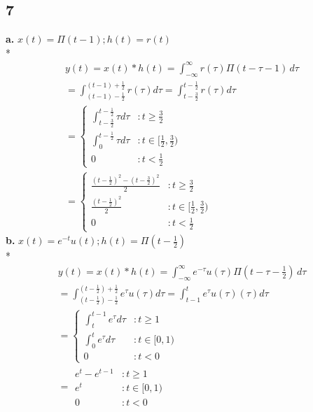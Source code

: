 \documentclass[12pt]{article}
\begin{document}
\subsection*{7}
\textbf{a.} 
$x(t) = \Pi ( t - 1); h(t) = r(t)$ \\*
\begin{align*}
	y(t) = x(t) * h(t) = \int_{-\infty}^{\infty} r(\tau) \Pi (t - \tau - 1) \, d\tau \\
	= \int_{(t - 1) - \frac{1}{2}}^{(t - 1) + \frac{1}{2}}r(\tau) d\tau
	= \int_{t - \frac{3}{2}}^{t - \frac{1}{2}}r(\tau) d\tau \\
           = \left\{
  		\begin{array}{lr}
		    \int_{t - \frac{3}{2}}^{t - \frac{1}{2}}\tau d\tau & : t\geq \frac{3}{2} \\
		    \int_{0}^{t - \frac{1}{2}}\tau d\tau & : t \in [\frac{1}{2}, \frac{3}{2})\\
	              0 & : t < \frac{1}{2}
		  \end{array}
	\right. \\
	=
	\boxed{
          	\left\{
  		\begin{array}{lr}
		    \frac{(t - \frac{1}{2})^2 - (t - \frac{3}{2})^2}{2} & : t \geq \frac{3}{2} \\
		    \frac{(t - \frac{1}{2})^2}{2} & : t \in [\frac{1}{2}, \frac{3}{2})\\
	              0 & : t < \frac{1}{2}
		  \end{array}
	\right.
	}
\end{align*}
\textbf{b.}
$x(t) = e^{-t}u(t); h(t) = \Pi (t - \frac{1}{2})$\\*
\begin{align*}
	y(t) = x(t) * h(t) = \int_{-\infty}^{\infty} e^{-\tau}u(\tau) \Pi (t - \tau - \frac{1}{2}) \, d\tau \\
	= \int_{(t - \frac{1}{2}) - \frac{1}{2}}^{(t - \frac{1}{2}) + \frac{1}{2}}e^\tau u(\tau) d\tau
	= \int_{t - 1}^{t}e^\tau u(\tau)(\tau) d\tau \\
           = \left\{
  		\begin{array}{lr}
		    \int_{t}^{t - 1}e^\tau  d\tau & : t\geq 1 \\
		    \int_{0}^{t}e^\tau d\tau & : t \in [0, 1)\\
	              0 & : t < 0
		  \end{array}
	\right. \\	
	=
	\boxed{
	\begin{array}{lr}
		    e^t - e^{t - 1} & : t\geq 1 \\
		    e^t & : t \in [0, 1)\\
	              0 & : t < 0
	 \end{array}
	}
\end{align*}
\end{document}
